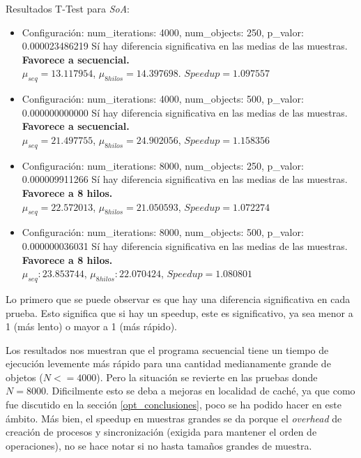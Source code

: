 \documentclass{article}
\begin{document}
Resultados T-Test para \textit{SoA}:

\begin{itemize}
\item Configuración: num\_iterations: 4000, num\_objects: 250, p\_valor: 0.000023486219
	Sí hay diferencia significativa en las medias de las muestras. \textbf{Favorece a secuencial.}\\
		$\mu_{seq} = 13.117954$, $\mu_{8hilos} = 14.397698$. $Speedup = 1.097557$

\item Configuración: num\_iterations: 4000, num\_objects: 500, p\_valor: 0.000000000000
	Sí hay diferencia significativa en las medias de las muestras. \textbf{Favorece a secuencial.}\\
		$\mu_{seq} = 21.497755$, $\mu_{8hilos} = 24.902056$, $Speedup = 1.158356$

\item Configuración: num\_iterations: 8000, num\_objects: 250, p\_valor: 0.000009911266
	Sí hay diferencia significativa en las medias de las muestras. \textbf{Favorece a 8 hilos.}\\
		$\mu_{seq} = 22.572013$, $\mu_{8hilos} = 21.050593$, $Speedup = 1.072274$

\item Configuración: num\_iterations: 8000, num\_objects: 500, p\_valor: 0.000000036031
	Sí hay diferencia significativa en las medias de las muestras. \textbf{Favorece a 8 hilos.}\\
		$\mu_{seq}: 23.853744$, $\mu_{8hilos}: 22.070424$, $Speedup = 1.080801$
\end{itemize}

Lo primero que se puede observar es que hay una diferencia significativa en cada prueba.
Esto significa que si hay un speedup, este es significativo, ya sea menor a 1 (más lento) o mayor a 1 (más rápido).

Los resultados nos muestran que el programa secuencial tiene un tiempo de ejecución levemente más rápido
para una cantidad medianamente grande de objetos (${N} <= 4000$). Pero la situación se revierte
en las pruebas donde ${N} = 8000$. Dificilmente esto se deba a mejoras en localidad de caché, ya que
como fue discutido en la sección \ref{opt_conclusiones}, poco se ha podido hacer en este ámbito.
Más bien, el speedup en muestras grandes se da porque el \textit{overhead} de creación
de procesos y sincronización (exigida para mantener el orden de operaciones), no se hace notar
si no hasta tamaños grandes de muestra.
\end{document}
